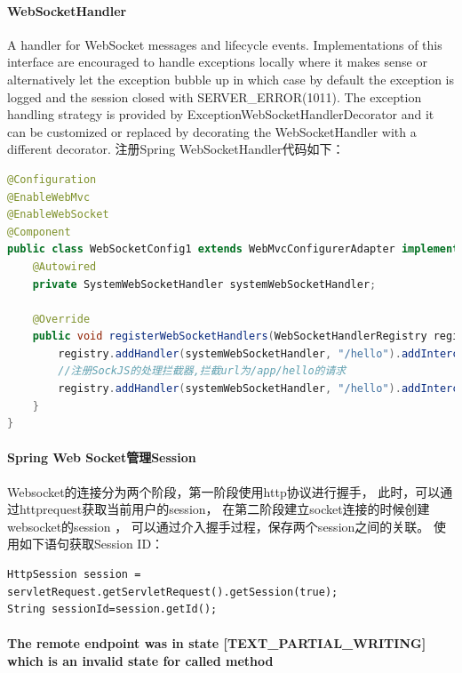 \documentclass{book}
\begin{document}
\paragraph{WebSocketHandler}
A handler for WebSocket messages and lifecycle events.
Implementations of this interface are encouraged to handle 
exceptions locally where it makes sense or alternatively let 
the exception bubble up in which case by default the exception 
is logged and the session closed with SERVER\_ERROR(1011). 
The exception handling strategy is provided by ExceptionWebSocketHandlerDecorator 
and it can be customized or replaced by decorating the WebSocketHandler with a different decorator.
注册Spring WebSocketHandler代码如下：

\begin{lstlisting}[language=Java]
@Configuration
@EnableWebMvc
@EnableWebSocket
@Component
public class WebSocketConfig1 extends WebMvcConfigurerAdapter implements WebSocketConfigurer {	
	@Autowired
	private SystemWebSocketHandler systemWebSocketHandler;
	
	@Override
	public void registerWebSocketHandlers(WebSocketHandlerRegistry registry) {
		registry.addHandler(systemWebSocketHandler, "/hello").addInterceptors(new WebSocketHandshakeInterceptor());
		//注册SockJS的处理拦截器,拦截url为/app/hello的请求
		registry.addHandler(systemWebSocketHandler, "/hello").addInterceptors(new WebSocketHandshakeInterceptor()).withSockJS();
	}	
}
\end{lstlisting}

\paragraph{Spring Web Socket管理Session}

Websocket的连接分为两个阶段，第一阶段使用http协议进行握手，
此时，可以通过httprequest获取当前用户的session，
在第二阶段建立socket连接的时候创建websocket的session ，
可以通过介入握手过程，保存两个session之间的关联。
使用如下语句获取Session ID：

\begin{lstlisting}[language={[Sharp]C}]
HttpSession session = servletRequest.getServletRequest().getSession(true);
String sessionId=session.getId();
\end{lstlisting}

\paragraph{The remote endpoint was in state [TEXT\_PARTIAL\_WRITING] which is an invalid state for called method}
\end{document}

